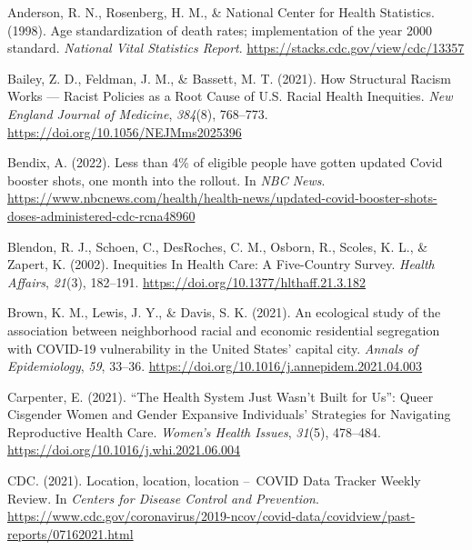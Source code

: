 \documentclass[
]{article}
\newlength{\cslhangindent}
\newlength{\cslentryspacingunit} %
\newenvironment{CSLReferences}[2] %
 {%
  \setlength{\parindent}{0pt}
  \ifodd #1
  \let\oldpar\par
  \def\par{\hangindent=\cslhangindent\oldpar}
  \fi
  \setlength{\parskip}{#2\cslentryspacingunit}
 }%
 {}
\begin{document}
\hypertarget{refs}{}
\begin{CSLReferences}{1}{0}
\leavevmode{}%
Anderson, R. N., Rosenberg, H. M., \& National Center for Health Statistics. (1998). Age standardization of death rates; implementation of the year 2000 standard. \emph{National Vital Statistics Report}. \url{https://stacks.cdc.gov/view/cdc/13357}

\leavevmode{}%
Bailey, Z. D., Feldman, J. M., \& Bassett, M. T. (2021). How {Structural} {Racism} {Works} --- {Racist} {Policies} as a {Root} {Cause} of {U}.{S}. {Racial} {Health} {Inequities}. \emph{New England Journal of Medicine}, \emph{384}(8), 768--773. \url{https://doi.org/10.1056/NEJMms2025396}

\leavevmode{}%
Bendix, A. (2022). Less than 4\% of eligible people have gotten updated {Covid} booster shots, one month into the rollout. In \emph{NBC News}. \url{https://www.nbcnews.com/health/health-news/updated-covid-booster-shots-doses-administered-cdc-rcna48960}

\leavevmode{}%
Blendon, R. J., Schoen, C., DesRoches, C. M., Osborn, R., Scoles, K. L., \& Zapert, K. (2002). Inequities {In} {Health} {Care}: {A} {Five}-{Country} {Survey}. \emph{Health Affairs}, \emph{21}(3), 182--191. \url{https://doi.org/10.1377/hlthaff.21.3.182}

\leavevmode{}%
Brown, K. M., Lewis, J. Y., \& Davis, S. K. (2021). An ecological study of the association between neighborhood racial and economic residential segregation with {COVID}-19 vulnerability in the {United} {States}' capital city. \emph{Annals of Epidemiology}, \emph{59}, 33--36. \url{https://doi.org/10.1016/j.annepidem.2021.04.003}

\leavevmode{}%
Carpenter, E. (2021). {``{The} {Health} {System} {Just} {Wasn}'t {Built} for {Us}''}: {Queer} {Cisgender} {Women} and {Gender} {Expansive} {Individuals}' {Strategies} for {Navigating} {Reproductive} {Health} {Care}. \emph{Women's Health Issues}, \emph{31}(5), 478--484. \url{https://doi.org/10.1016/j.whi.2021.06.004}

\leavevmode{}%
CDC. (2021). Location, location, location --~{COVID} {Data} {Tracker} {Weekly} {Review}. In \emph{Centers for Disease Control and Prevention}. \url{https://www.cdc.gov/coronavirus/2019-ncov/covid-data/covidview/past-reports/07162021.html}


\end{CSLReferences}
\end{document}
